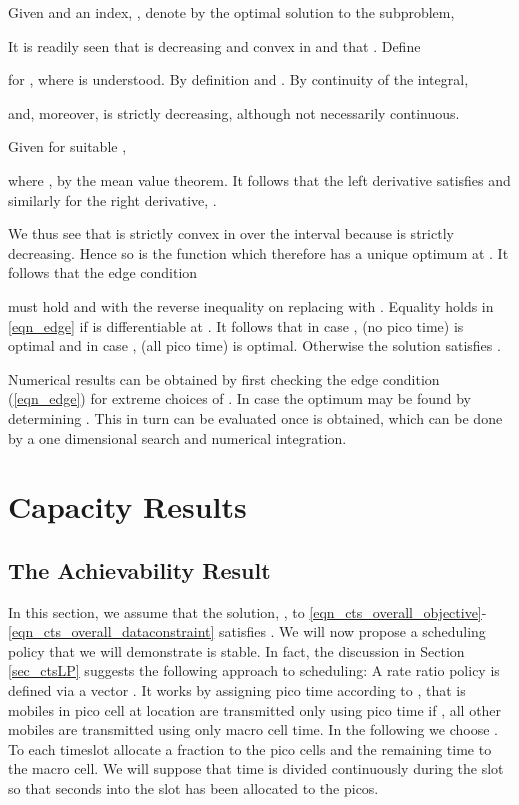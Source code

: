 \documentclass[12pt, draftcls, onecolumn]{IEEEtranTCOM}
\begin{document}
Given  and an index, , denote by  the optimal solution to the
subproblem,

It is readily seen that  is decreasing and convex in  and that . Define

for , where  is understood. By definition
 and . By continuity of the integral,

and, moreover,  is strictly decreasing, although not necessarily continuous.

Given  for suitable ,

where , by the mean value theorem. It follows that
the left derivative satisfies  and similarly for the right
derivative, .

We thus see that  is strictly convex in  over the interval  because 
is strictly decreasing. Hence so is the
function  which therefore has a unique optimum at .
It follows that the edge condition

must hold and with the reverse inequality on replacing  with . Equality holds in \eqref{eqn_edge} if 
is differentiable at . It follows that in case ,  (no pico time) is optimal and in case ,  (all pico time) is optimal. Otherwise the solution
satisfies .

Numerical results can be obtained by first checking the edge condition (\ref{eqn_edge}) for extreme choices
of . In case  the optimum may be
found by determining . This in turn can be evaluated once  is obtained, which
can be done by a one dimensional search and numerical integration.


\section{Capacity Results}
\label{sec_capres}
\subsection{The Achievability Result}
\label{sec_achievable}
In this section, we assume that the solution, , to \eqref{eqn_cts_overall_objective}-\eqref{eqn_cts_overall_dataconstraint} satisfies . We will now propose a scheduling policy that we will demonstrate is stable. In fact, the discussion in Section \ref{sec_ctsLP} suggests the following approach to scheduling: A rate ratio policy is defined via
a vector . It works by assigning pico time according to , that is mobiles in
pico cell  at location  are transmitted only using pico time if
,
all other mobiles are transmitted using only macro cell time. In the following we choose
. To each timeslot allocate a fraction
 to the pico cells and the remaining time to the macro cell. We will suppose that time is
divided continuously during the slot so that  seconds into the slot  has been allocated to
the picos.
\end{document}
